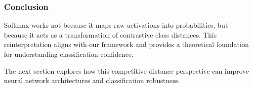 \subsubsection{Conclusion}

Softmax works not because it maps raw activations into probabilities, but because it acts as a transformation of contrastive class distances. This reinterpretation aligns with our framework and provides a theoretical foundation for understanding classification confidence. 

The next section explores how this competitive distance perspective can improve neural network architectures and classification robustness.
